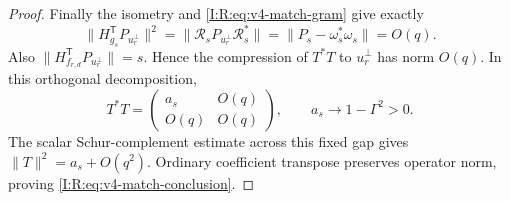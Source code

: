 \begin{proof}
Finally the isometry and \eqref{I:R:eq:v4-match-gram} give exactly
\[
 \|H_{g_s}^{\mathsf T}P_{u_r^\perp}\|^2
 =\|\mathcal R_sP_{u_r^\perp}\mathcal R_s^*\|
 =\|P_s-\omega_s^*\omega_s\|=O(q).
\]
Also $\|H_{f_{r,d}}^{\mathsf T}P_{u_r^\perp}\|=s$.
Hence the compression of $T^*T$ to $u_r^\perp$ has norm $O(q)$.
In this orthogonal decomposition,
\[
 T^*T=\begin{pmatrix}a_s&O(q)\\O(q)&O(q)\end{pmatrix},\qquad
 a_s\longrightarrow1-\Gamma^2>0.
\]
The scalar Schur-complement estimate across this fixed gap gives
$\|T\|^2=a_s+O(q^2)$.  Ordinary coefficient transpose preserves
operator norm, proving \eqref{I:R:eq:v4-match-conclusion}.
\end{proof}
